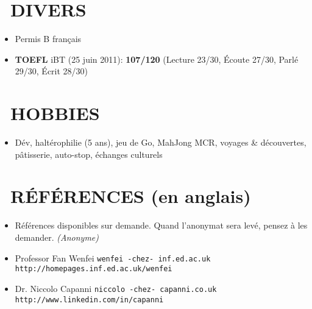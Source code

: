 \documentclass{res}
\begin{document}
\begin{resume}
\section{\faMagic~DIVERS}
	\begin{itemize}
		\item[] Permis B fran\c{c}ais
		\item[] \textbf{TOEFL} iBT (25 juin 2011): \textbf{107/120} (Lecture 23/30, \'Ecoute 27/30, Parl\'e 29/30, \'Ecrit 28/30)		
		    \end{itemize} 
 
\section{\faGamepad~HOBBIES}
	\begin{itemize}
		\item[] D\'ev, halt\'erophilie (5 ans), jeu de Go, MahJong MCR, voyages \& d\'ecouvertes, p\^atisserie, auto-stop, \'echanges culturels
	\end{itemize}

\section{\faUserCheck~R\'EF\'ERENCES (en anglais)}
\ifisanon 
    \begin{itemize}
			\item[] R\'ef\'erences disponibles sur demande. Quand l'anonymat sera lev\'e, pensez \`a les demander. \textit{(Anonyme)}
    \end{itemize}
\else
		\begin{itemize}
			\item[] Professor Fan Wenfei \tabto{4cm} \texttt{wenfei -chez- inf.ed.ac.uk} \hfill \texttt{http://homepages.inf.ed.ac.uk/wenfei}
			\item[] Dr. Niccolo Capanni \tabto{4cm} \texttt{niccolo -chez- capanni.co.uk} \hfill \texttt{http://www.linkedin.com/in/capanni}
		\end{itemize}
\fi
\end{resume}
\end{document}
